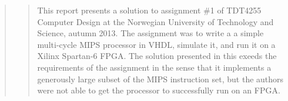 \begin{quote}
\begin{quote}
This report presents a solution to assignment \#1 of TDT4255 Computer Design at the Norwegian University of Technology and Science, autumn 2013.
The assignment was to write a a simple multi-cycle MIPS processor in VHDL, simulate it, and run it on a Xilinx Spartan-6 FPGA.
The solution presented in this exeeds the requirements of the assignment in the sense that it implements a generously large subset of the MIPS instruction set, but the authors were not able to get the processor to successfully run on an FPGA.
\end{quote}
\end{quote}
